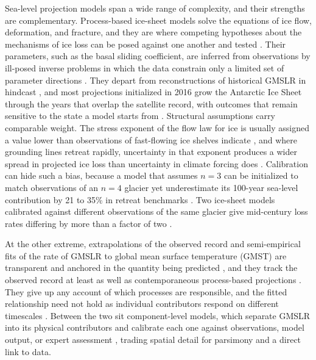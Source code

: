 \documentclass[12pt]{article}
\begin{document}
Sea-level projection models span a wide range of complexity, and their strengths are
complementary. Process-based ice-sheet models solve the equations of ice flow,
deformation, and fracture, and they are where competing hypotheses about the mechanisms
of ice loss can be posed against one another and tested \citep{Schoof2007,Morlighem2024}.
Their parameters, such as the basal sliding coefficient, are inferred from observations by ill-posed inverse problems in which the data constrain only a limited set of parameter directions \citep{Isaac2015,Petra2014}. They depart from reconstructions of historical GMSLR in hindcast \citep{Aschwanden2021}, and most
projections initialized in 2016 grow the Antarctic Ice Sheet through the years that
overlap the satellite record, with outcomes that remain sensitive to the state a model starts from \citep{Fricker2025}. Structural assumptions carry comparable weight. The stress exponent of the flow law for ice is usually assigned a value lower than observations of fast-flowing ice shelves indicate \citep{Millstein2022}, and where grounding lines retreat rapidly, uncertainty in that exponent produces a wider spread in projected ice loss than uncertainty in climate forcing does \citep{GetraerMorlighem2025}. Calibration can hide such a bias, because a model that assumes $n = 3$ can be initialized to match observations of an $n = 4$ glacier yet underestimate its 100-year sea-level contribution by 21 to 35\% in retreat benchmarks \citep{Martin2026}. Two ice-sheet models calibrated against different observations of the same glacier give mid-century loss rates differing by more than a factor of two \citep{Goldberg2026}. %

At the other extreme, extrapolations of the observed record and semi-empirical fits of
the rate of GMSLR to global mean surface temperature (GMST) are transparent and anchored
in the quantity being predicted \citep{Nerem2022,Rahmstorf2007,Vermeer2009,Kopp2016}, and
they track the observed record at least as well as contemporaneous process-based
projections \citep{Rahmstorf2012}. They give up any account of which processes are
responsible, and the fitted relationship need not hold as individual contributors respond
on different timescales \citep{Church2013}. Between the two sit component-level models,
which separate GMSLR into its physical contributors and calibrate each one against
observations, model output, or expert assessment
\citep{Kopp2014,Mengel2016,Wong2017,Perrette2013,Nauels2017,Kopp2023}, trading spatial
detail for parsimony and a direct link to data.
\end{document}
